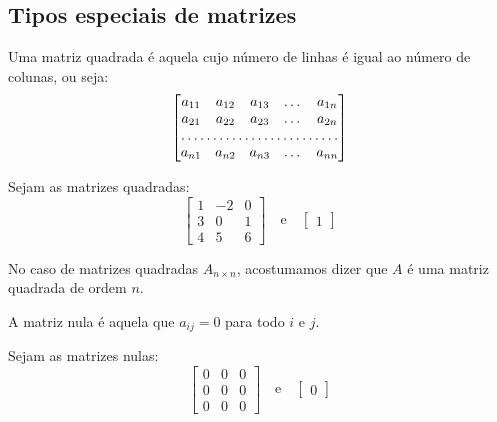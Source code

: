 \subsection{Tipos especiais de matrizes}

\begin{df}
Uma matriz quadrada é aquela cujo número de linhas é igual ao número de colunas, ou seja:\\

\[\begin{bmatrix}
a_{11}       & a_{12} & a_{13} & \dots & a_{1n} \\
a_{21}       & a_{22} & a_{23} & \dots & a_{2n} \\
\hdotsfor{5} \\
a_{n1}       & a_{n2} & a_{n3} & \dots & a_{nn}
\end{bmatrix}\]
\end{df}

\begin{ex}
	Sejam as matrizes quadradas:\\
	\begin{equation*}
	\begin{bmatrix}
	1   &-2 & 0 \\
	3   & 0 & 1 \\
	4   & 5 & 6
	\end{bmatrix} \quad \text{e} \quad \begin{bmatrix}
	1  
	\end{bmatrix}
	\end{equation*}
	
\end{ex}
No caso de matrizes quadradas $A_{n\times n}$, acostumamos dizer que $A$ é uma matriz quadrada de ordem $n$.
\begin{df}
	A matriz nula é aquela que $a_{ij}=0$ para todo $i$ e $j$.
\end{df}

\begin{ex}
	Sejam as matrizes nulas:\\
	\begin{equation*}
	\begin{bmatrix}
	0   & 0 & 0 \\
	0   & 0 & 0 \\
	0   & 0 & 0
	\end{bmatrix}\quad \text{e} \quad \begin{bmatrix}
	0  
	\end{bmatrix}
	\end{equation*}
	
\end{ex}

